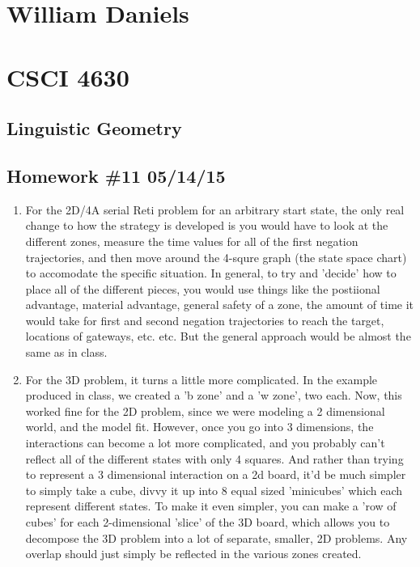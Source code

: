\documentclass[11pt]{article}
\begin{document}
\begin{center}
\section*{William Daniels}
\section*{CSCI 4630}
\subsection*{Linguistic Geometry}
\subsection*{Homework \#11 05/14/15}
\end{center}

\vspace{.25cm}

\begin{enumerate}
\item For the 2D/4A serial Reti problem for an arbitrary start state, the only real change to how the strategy is developed is you would have to look at the different zones, measure the time values for all of the first negation trajectories, and then move around the 4-squre graph (the state space chart) to accomodate the specific situation. In general, to try and 'decide' how to place all of the different pieces, you would use things like the postiional advantage, material advantage, general safety of a zone, the amount of time it would take for first and second negation trajectories to reach the target, locations of gateways, etc. etc. But the general approach would be almost the same as in class. 
\item For the 3D problem, it turns a little more complicated. In the example produced in class, we created a 'b zone' and a 'w zone', two each. Now, this worked fine for the 2D problem, since we were modeling a 2 dimensional world, and the model fit. However, once you go into 3 dimensions, the interactions can become a lot more complicated, and you probably can't reflect all of the different states with only 4 squares. And rather than trying to represent a 3 dimensional interaction on a 2d board, it'd be much simpler to simply take a cube, divvy it up into 8 equal sized 'minicubes' which each represent different states. To make it even simpler, you can make a 'row of cubes' for each 2-dimensional 'slice' of the 3D board, which allows you to decompose the 3D problem into a lot of separate, smaller, 2D problems. Any overlap should just simply be reflected in the various zones created. 
\end{enumerate}
\end{document}
